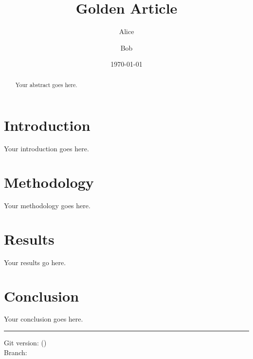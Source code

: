 \documentclass[a4paper,11pt]{article}
\title{Golden Article}
\author{Alice \and Bob}
\date{\today}
\begin{document}
\maketitle

\begin{abstract}
    Your abstract goes here.
\end{abstract}

\section{Introduction}

Your introduction goes here.

\section{Methodology}

Your methodology goes here.

\section{Results}

Your results go here.

\section{Conclusion}

Your conclusion goes here.

\printbibliography

\vfill
\hrule
\small
\noindent Git version: \gitAbbrevHash{} (\gitAuthorIsoDate) \\
Branch: \gitBranch
\end{document}

